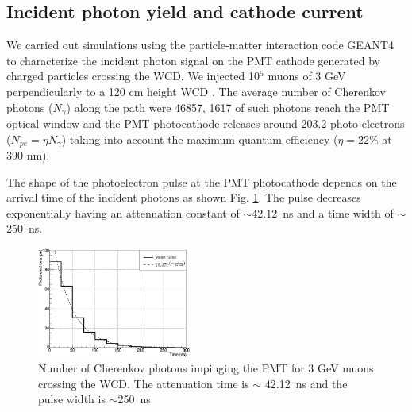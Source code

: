 \documentclass[letterpaper, 10 pt, conference]{ieeeconf}  %
\begin{document}
\subsection{Incident photon yield and cathode current}

We carried out simulations using the particle-matter interaction code GEANT4 to characterize the incident photon signal on the PMT cathode generated by charged particles crossing the WCD. We injected 10$^5$ muons of 3 GeV perpendicularly to a 120 cm height WCD \cite{Vasquez2019, Caldern2015}. The average number of Cherenkov photons ($N_{\gamma}$) along the path were 46857, 1617 of such photons reach the PMT optical window and the PMT photocathode releases around 203.2 photo-electrons ($N_{pe} = \eta N_{\gamma}$) taking into account the maximum quantum efficiency ($\eta = 22 \%$ at 390 nm). 



The shape of the photoelectron pulse at the PMT photocathode depends on the arrival time of the incident photons as shown Fig. \ref{pulse_G4}. The pulse decreases exponentially having an attenuation constant of $\sim$42.12~ns and a time width of $\sim$250~ns.

\begin{figure}[h!]
\begin{center}
\includegraphics[width=0.45\textwidth]{Figures/pulse_vem.png}
\caption{Number of Cherenkov photons impinging the PMT for 3 GeV muons crossing the WCD. The attenuation time is $\sim$ 42.12~ns and the pulse width is $\sim$250~ns \cite{Vasquez2019}}
\label{pulse_G4}
\end{center}
\end{figure}

\end{document}
